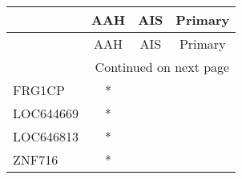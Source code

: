 \begin{longtable}{lccc}
\toprule
{} & AAH & AIS & Primary \\
\midrule
\endfirsthead

\toprule
{} & AAH & AIS & Primary \\
\midrule
\endhead
\midrule
\multicolumn{4}{r}{{Continued on next page}} \\
\midrule
\endfoot

\bottomrule
\endlastfoot
FRG1CP    &   * &     &         \\
LOC644669 &   * &     &         \\
LOC646813 &   * &     &         \\
ZNF716    &   * &     &         \\
\end{longtable}
